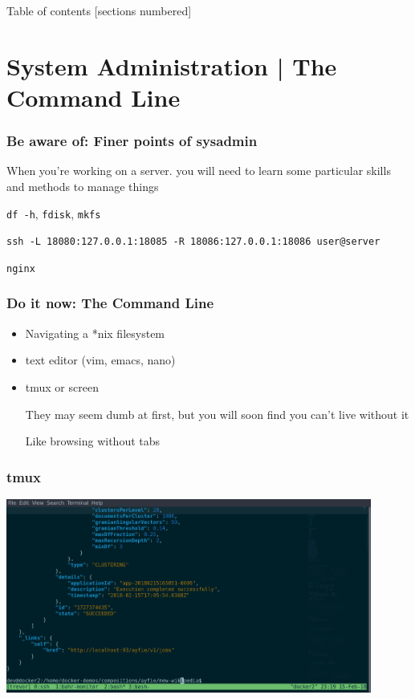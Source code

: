 \documentclass[10pt]{beamer}
\begin{document}
\begin{frame}{Table of contents}
  [sections numbered]
  \tableofcontents[hideallsubsections]
\end{frame}



\section{System Administration | The Command Line}


\begin{frame}[c]
	\frametitle{Be aware of: Finer points of sysadmin}
	\pause
	When you're working on a server. you will need to learn some particular skills and methods to manage things

	\begin{description}[<+->]
		\item[Managing volumes] \texttt{df -h}, \texttt{fdisk}, \texttt{mkfs}
		\item[ssh tunnels and UDP] \texttt{ssh -L 18080:127.0.0.1:18085 -R 18086:127.0.0.1:18086 user@server}
		\item[web access control]  \texttt{nginx}
	\end{description}
\end{frame}


\begin{frame}[c]
	\frametitle{Do it now: The Command Line}
	\begin{itemize}[<+->]
		\item Navigating a *nix filesystem
		\item text editor (vim, emacs, nano)
		\item tmux or screen

		They may seem dumb at first, but you will soon find you can't live without it

		Like browsing without tabs
	\end{itemize}
\end{frame}

\begin{frame}[standout]
	\frametitle{tmux}

	\centerline{\includegraphics[width=12cm]{tmux.png}}
\end{frame}
\end{document}
